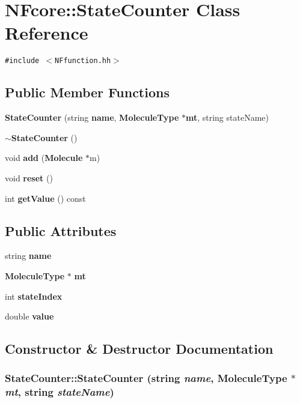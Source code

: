 \section{NFcore::StateCounter Class Reference}
\label{classNFcore_1_1StateCounter}
{\tt \#include $<$NFfunction.hh$>$}

\subsection*{Public Member Functions}
\begin{CompactItemize}
\item 
{\bf StateCounter} (string {\bf name}, {\bf MoleculeType} $\ast${\bf mt}, string stateName)
\item 
{\bf $\sim$StateCounter} ()
\item 
void {\bf add} ({\bf Molecule} $\ast$m)
\item 
void {\bf reset} ()
\item 
int {\bf getValue} () const 
\end{CompactItemize}
\subsection*{Public Attributes}
\begin{CompactItemize}
\item 
string {\bf name}
\item 
{\bf MoleculeType} $\ast$ {\bf mt}
\item 
int {\bf stateIndex}
\item 
double {\bf value}
\end{CompactItemize}


\subsection{Constructor \& Destructor Documentation}
\subsubsection{\setlength{\rightskip}{0pt plus 5cm}StateCounter::StateCounter (string {\em name}, {\bf MoleculeType} $\ast$ {\em mt}, string {\em stateName})}\label{classNFcore_1_1StateCounter_29a85dac199f2bc9ba0939f167c93ffd}


